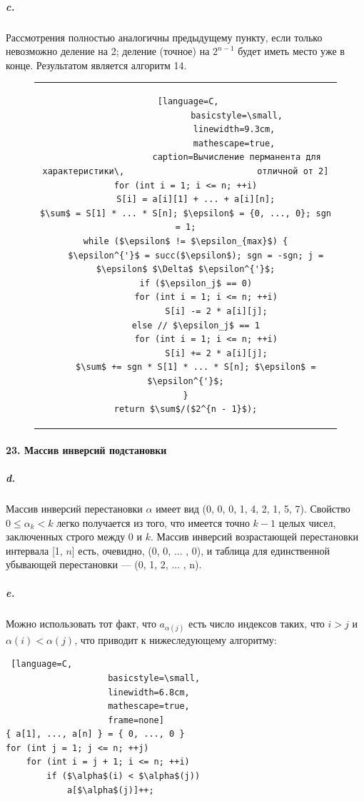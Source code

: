 \documentclass{../../template/mai_book}
\begin{document}
\newpage


\subparagraph{c.} Рассмотрения полностью аналогичны предыдущему пункту, если
только невозможно деление на 2; деление (точное) на $2^{n - 1}$ будет иметь
место уже в конце. Результатом является алгоритм 14. \newline

\begin{figure}[htp]
\centering
\begin{tabular}{c}
\begin{lstlisting} [language=C,
					basicstyle=\small,
					linewidth=9.3cm, 
					mathescape=true, 
					caption=Вычисление перманента для характеристики\, 							отличной от 2]
for (int i = 1; i <= n; ++i)
	S[i] = a[i][1] + ... + a[i][n];
$\sum$ = S[1] * ... * S[n]; $\epsilon$ = {0, ..., 0}; sgn = 1;
while ($\epsilon$ != $\epsilon_{max}$) {
	$\epsilon^{'}$ = succ($\epsilon$); sgn = -sgn; j = $\epsilon$ $\Delta$ $\epsilon^{'}$;
	if ($\epsilon_j$ == 0)
		for (int i = 1; i <= n; ++i)
			S[i] -= 2 * a[i][j];
	else // $\epsilon_j$ == 1
		for (int i = 1; i <= n; ++i)
			S[i] += 2 * a[i][j];
	$\sum$ += sgn * S[1] * ... * S[n]; $\epsilon$ = $\epsilon^{'}$;
}
return $\sum$/($2^{n - 1}$);
\end{lstlisting}
\end{tabular}
\end{figure}

\paragraph{23. Массив инверсий подстановки}

\subparagraph{d.} Массив инверсий перестановки $\alpha$ имеет вид (0, 0, 0, 1, 4, 2, 1, 5, 7). Свойство $0 \leqslant \alpha_k < k$ легко получается из того, что имеется точно $k - 1$ целых чисел, заключенных строго между 0 и $k$. Массив инверсий возрастающей перестановки интервала [1, $n$] есть, очевидно, (0, 0, ... , 0), и таблица для единственной убывающей перестановки —  (0, 1, 2, ... , n).

\subparagraph{e.} Можно использовать тот факт, что $a_{\alpha(j)}$ есть число индексов таких, что $i > j$ и $\alpha(i) < \alpha(j)$, что приводит к нижеследующему алгоритму:

\begin{leftbar}
\begin{lstlisting} [language=C,
					basicstyle=\small,
					linewidth=6.8cm, 
					mathescape=true, 
					frame=none]
{ a[1], ..., a[n] } = { 0, ..., 0 }
for (int j = 1; j <= n; ++j)
	for (int i = j + 1; i <= n; ++i)
		if ($\alpha$(i) < $\alpha$(j))
			a[$\alpha$(j)]++; 
\end{lstlisting}
\end{leftbar}
\end{document}
